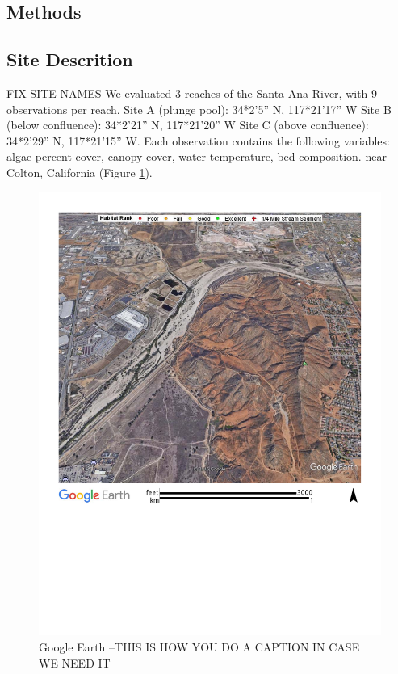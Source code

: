 \documentclass{article}\usepackage[]{graphicx}\usepackage[]{color}
\begin{document}
\subsection{Methods}


\subsection{Site Descrition}

FIX SITE NAMES
We evaluated 3 reaches of the Santa Ana River, with 9 observations per reach. Site A (plunge pool): 34*2’5” N, 117*21’17” W Site B (below conﬂuence): 34*2’21” N, 117*21’20” W Site C (above conﬂuence): 34*2’29” N, 117*21’15” W. Each observation contains the following variables: algae percent cover, canopy cover, water temperature, bed composition. near Colton, California (Figure \ref{SAR_Image}). 

\begin{figure}
\includegraphics[width=1.00\textwidth]{Figures/SantaAna_SatelliteImage}
\caption{Google Earth --THIS IS HOW YOU DO A CAPTION IN CASE WE NEED IT}
\label{SAR_Image}
\end{figure}
\end{document}

